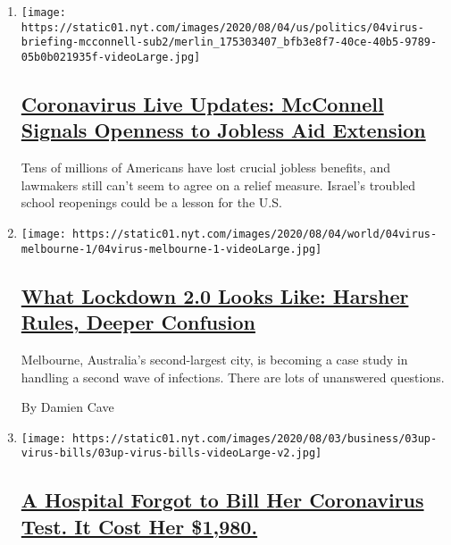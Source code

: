 \begin{enumerate}
\def\labelenumi{\arabic{enumi}.}
\item
  \texttt{[image: https://static01.nyt.com/images/2020/08/04/us/politics/04virus-briefing-mcconnell-sub2/merlin\_175303407\_bfb3e8f7-40ce-40b5-9789-05b0b021935f-videoLarge.jpg]}

  \hypertarget{coronavirus-live-updates-mcconnell-signals-openness-to-jobless-aid-extension}{%
  \subsection{\texorpdfstring{\href{/2020/08/04/world/coronavirus-cases.html}{Coronavirus
  Live Updates: McConnell Signals Openness to Jobless Aid
  Extension}}{Coronavirus Live Updates: McConnell Signals Openness to Jobless Aid Extension}}\label{coronavirus-live-updates-mcconnell-signals-openness-to-jobless-aid-extension}}

  Tens of millions of Americans have lost crucial jobless benefits, and
  lawmakers still can't seem to agree on a relief measure. Israel's
  troubled school reopenings could be a lesson for the U.S.
\item
  \texttt{[image: https://static01.nyt.com/images/2020/08/04/world/04virus-melbourne-1/04virus-melbourne-1-videoLarge.jpg]}

  \hypertarget{what-lockdown-20-looks-like-harsher-rules-deeper-confusion}{%
  \subsection{\texorpdfstring{\href{/2020/08/04/world/australia/coronavirus-melbourne-lockdown.html}{What
  Lockdown 2.0 Looks Like: Harsher Rules, Deeper
  Confusion}}{What Lockdown 2.0 Looks Like: Harsher Rules, Deeper Confusion}}\label{what-lockdown-20-looks-like-harsher-rules-deeper-confusion}}

  Melbourne, Australia's second-largest city, is becoming a case study
  in handling a second wave of infections. There are lots of unanswered
  questions.

  By Damien Cave
\item
  \texttt{[image: https://static01.nyt.com/images/2020/08/03/business/03up-virus-bills/03up-virus-bills-videoLarge-v2.jpg]}

  \hypertarget{a-hospital-forgot-to-bill-her-coronavirus-test-it-cost-her-1980}{%
  \subsection{\texorpdfstring{\href{/2020/08/03/upshot/nj-coronavirus-medical-bill.html}{A
  Hospital Forgot to Bill Her Coronavirus Test. It Cost Her
  \$1,980.}}{A Hospital Forgot to Bill Her Coronavirus Test. It Cost Her \$1,980.}}\label{a-hospital-forgot-to-bill-her-coronavirus-test-it-cost-her-1980}}


\end{enumerate}
